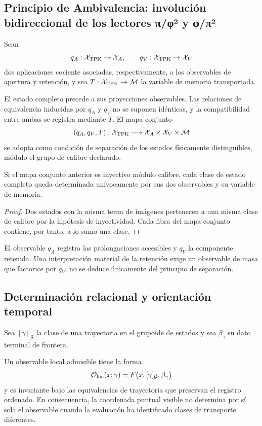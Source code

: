 \subsection{Principio de Ambivalencia: involución bidireccional de los lectores π/φ² y φ/π²}

Sean
\[
 q_A:\mathcal X_{\rm TPK}\to\mathcal X_A,
 \qquad
 q_V:\mathcal X_{\rm TPK}\to\mathcal X_V
\]
dos aplicaciones cociente asociadas, respectivamente, a los observables de
apertura y retención, y sea
\(T:\mathcal X_{\rm TPK}\to\mathcal M\) la variable de memoria
transportada.

\begin{principle}[Ambivalencia]
El estado completo precede a sus proyecciones observables. Las relaciones de
equivalencia inducidas por \(q_A\) y \(q_V\) no se suponen idénticas, y la
compatibilidad entre ambas se registra mediante \(T\). El mapa conjunto
\[
 (q_A,q_V,T):\mathcal X_{\rm TPK}
 \longrightarrow\mathcal X_A\times\mathcal X_V\times\mathcal M
\]
se adopta como condición de separación de los estados físicamente
distinguibles, módulo el grupo de calibre declarado.
\end{principle}

\begin{proposition}
Si el mapa conjunto anterior es inyectivo módulo calibre, cada clase de
estado completo queda determinada unívocamente por sus dos observables y su
variable de memoria.
\end{proposition}
\begin{proof}
Dos estados con la misma terna de imágenes pertenecen a una misma clase de
calibre por la hipótesis de inyectividad. Cada fibra del mapa conjunto
contiene, por tanto, a lo sumo una clase.
\end{proof}

El observable \(q_A\) registra las prolongaciones accesibles y \(q_V\) la
componente retenida. Una interpretación material de la retención exige un
observable de masa que factorice por \(q_V\); no se deduce únicamente del
principio de separación.

\subsection{Determinación relacional y orientación temporal}

Sea \([\gamma]_{\mathcal G}\) la clase de una trayectoria en el grupoide de
estados y sea \(\beta_\gamma\) su dato terminal de frontera.
\begin{principle}
Un observable local admisible tiene la forma
\[
 \mathcal O_{\rm loc}(x;\gamma)
 =F\bigl(x,[\gamma]_{\mathcal G},\beta_\gamma\bigr)
\]
y es invariante bajo las equivalencias de trayectoria que preservan el
registro ordenado. En consecuencia, la coordenada puntual visible no determina
por sí sola el observable cuando la evaluación ha identificado clases de
transporte diferentes.
\end{principle}

